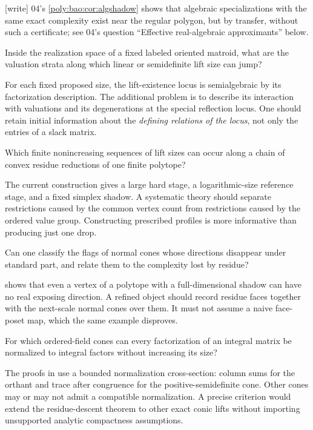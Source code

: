 \documentclass[11pt,a4paper]{article}
\numberwithin{equation}{section}
\theoremstyle{plain}
\newcommand{\wtag}{\textup{[write]}}%
\begin{document}
\wtag{} 04's \cref{poly:bao:cor:algshadow} shows that algebraic
specializations with the same exact complexity exist near the regular
polygon, but by transfer, without such a certificate; see 04's question
``Effective real-algebraic approximants'' below.

\begin{question}
Inside the realization space of a fixed labeled oriented matroid, what
are the valuation strata along which linear or semidefinite lift size
can jump?
\end{question}
For each fixed proposed size, the lift-existence locus is semialgebraic
by its factorization description. The additional problem is to describe
its interaction with valuations and its degenerations at the special
reflection locus. One should retain initial information about the
\emph{defining relations of the locus}, not only the entries of a
slack matrix.

\begin{question}
Which finite nonincreasing sequences of lift sizes can occur along a
chain of convex residue reductions of one finite polytope?
\end{question}
The current construction gives a large hard stage, a logarithmic-size
reference stage, and a fixed simplex shadow. A systematic theory should
separate restrictions caused by the common vertex count from restrictions
caused by the ordered value group. Constructing prescribed profiles is
more informative than producing just one drop.

\begin{question}
Can one classify the flags of normal cones whose directions disappear
under standard part, and relate them to the complexity lost by residue?
\end{question}
 shows that even a vertex of a polytope with a
full-dimensional shadow can have no real exposing direction. A refined
object should record residue faces together with the next-scale normal
cones over them. It must not assume a naive face-poset map, which the
same example disproves.

\begin{question}
For which ordered-field cones can every factorization of an integral
matrix be normalized to integral factors without increasing its size?
\end{question}
The proofs in  use a bounded normalization cross-section:
column sums for the orthant and trace after congruence for the
positive-semidefinite cone. Other cones may or may not admit a compatible
normalization. A precise criterion would extend the residue-descent
theorem to other exact conic lifts without importing unsupported
analytic compactness assumptions.
\end{document}
